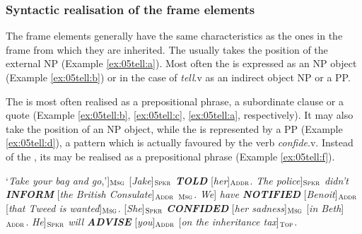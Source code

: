 \documentclass[output=paper,colorlinks,citecolor=brown]{langscibook}
\begin{document}
\subsubsection{Syntactic realisation of the  frame elements}

The frame elements generally have the same characteristics as the ones in the  frame from which they are inherited. The  usually takes the position of the external NP (Example \ref{ex:05tell:a}). Most often the  is expressed as an NP object (Example \ref{ex:05tell:b}) or in the case of \textit{tell}.v as an indirect object NP or a PP. %

\largerpage
The  is most often realised as a prepositional phrase, a subordinate clause or a quote (Example \ref{ex:05tell:b}, \ref{ex:05tell:c}, \ref{ex:05tell:a}, respectively). It may also take the position of an NP object, while the  is represented by a PP (Example \ref{ex:05tell:d}), a pattern which is actually favoured by the verb \textit{confide}.v. %
Instead of the , its  may be realised as a prepositional phrase (Example \ref{ex:05tell:f}). 

\begin{exe}
\ex \label{ex:05tell}
\begin{xlist}
\ex  \label{ex:05tell:a}
\glt {[}`\textit{Take your bag and go},'{]}$_{\text{\textsc{Msg}}}$ [\textit{Jake}]$_{\text{\textsc{Spkr}}}$ \textit{\textbf{TOLD}} [\textit{her}]$_{\text{\textsc{Addr}}}$.
\ex  \label{ex:05tell:b}
\glt {[}\textit{The police}{]}$_{\text{\textsc{Spkr}}}$ \textit{didn't \textbf{INFORM}} [\textit{the British Consulate}]$_{\text{\textsc{Addr}}}$ $_{\text{\textsc{Msg}}}$. 
 \ex  \label{ex:05tell:c}
\glt {[}\textit{We}{]} \textit{have \textbf{NOTIFIED}} [\textit{Benoit}]$_{\text{\textsc{Addr}}}$ [\textit{that Tweed is wanted}]$_{\text{\textsc{Msg}}}$.
 \ex  \label{ex:05tell:d}
{[}\textit{She}{]}$_{\text{\textsc{Spkr}}}$ \textit{\textbf{CONFIDED}} [\textit{her sadness}]$_{\text{\textsc{Msg}}}$ [\textit{in Beth}]$_{\text{\textsc{Addr}}}$.
 \ex  \label{ex:05tell:f}
\glt {[}\textit{He}{]}$_{\text{\textsc{Spkr}}}$ \textit{will \textbf{ADVISE}} [\textit{you}]$_{\text{\textsc{Addr}}}$ [\textit{on the inheritance tax}]$_{\text{\textsc{Top}}}$.
\end{xlist}
\end{exe}
\end{document}
